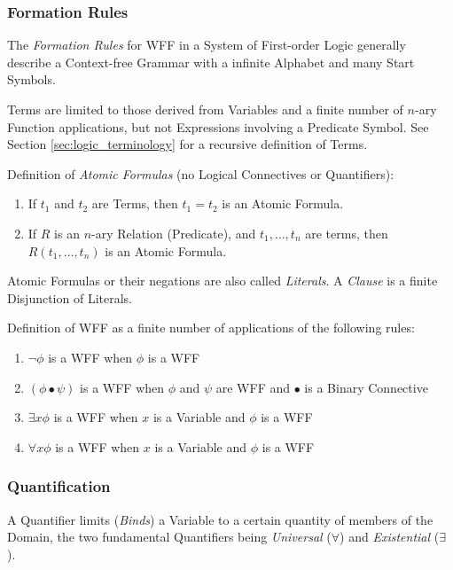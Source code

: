 \documentclass{article}
\begin{document}
\subsubsection{Formation Rules}\label{subsec:formation_rules}

The \emph{Formation Rules} for WFF in a System of First-order Logic
generally describe a Context-free Grammar with a infinite Alphabet and
many Start Symbols.

Terms are limited to those derived from Variables and a finite number
of $n$-ary Function applications, but not Expressions involving a
Predicate Symbol. See Section \ref{sec:logic_terminology} for a recursive
definition of Terms.

Definition of \emph{Atomic Formulas} (no Logical Connectives or Quantifiers):
\begin{enumerate}
\item If $t_1$ and $t_2$ are Terms, then $t_1 = t_2$ is an Atomic Formula.
\item If $R$ is an $n$-ary Relation (Predicate), and $t_1,\ldots,t_n$
  are terms, then $R(t_1,\ldots,t_n)$ is an Atomic Formula.
\end{enumerate}
Atomic Formulas or their negations are also called \emph{Literals}. A
\emph{Clause} is a finite Disjunction of Literals.

Definition of WFF as a finite number of applications of the following rules:
\begin{enumerate}
\item $\neg \phi$ is a WFF when $\phi$ is a WFF
\item $(\phi \bullet \psi)$ is a WFF when $\phi$ and $\psi$ are WFF
  and $\bullet$ is a Binary Connective
\item $\exists x \phi$ is a WFF when $x$ is a Variable and $\phi$ is a WFF
\item $\forall x \phi$ is a WFF when $x$ is a Variable and $\phi$ is a WFF
\end{enumerate}

\subsubsection{Quantification}\label{subsec:firstorder_quantification}

A Quantifier limits (\emph{Binds}) a Variable to a certain quantity of
members of the Domain, the two fundamental Quantifiers being
\emph{Universal} ($\forall$) and \emph{Existential} ($\exists$).
\end{document}
